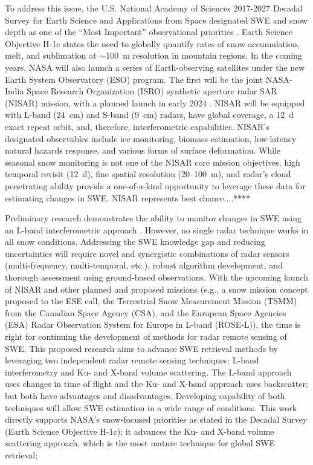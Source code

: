 To address this issue, the U.S. National Academy of Sciences 2017-2027 Decadal Survey for Earth Science and Applications from Space designated SWE and snow depth as one of the “Most Important” observational priorities \citep{nationalacademiesofsciencesengineeringandmedicineThrivingOurChanging2019}. Earth Science Objective H-1c states the need to globally quantify rates of snow accumulation, melt, and sublimation at $\sim$100~m resolution in mountain regions. In the coming years, NASA will also launch a series of Earth-observing satellites under the new Earth System Observatory (ESO) program. The first will be the joint NASA-India Space Research Organization (ISRO) synthetic aperture radar SAR (NISAR) mission, with a planned launch in early 2024 \citep{rosenNASAISROSARNISAR2017, kelloggNASAISROSyntheticAperture2020}. NISAR will be equipped with L-band (24~cm) and S-band (9~cm) radars, have global coverage, a 12~d exact repeat orbit, and, therefore, interferometric capabilities. NISAR’s designated observables include ice monitoring, biomass estimation, low-latency natural hazards response, and various forms of surface deformation. While seasonal snow monitoring is not one of the NISAR core mission objectives, high temporal revisit (12~d), fine spatial resolution (20--100~m), and radar’s cloud penetrating ability provide a one-of-a-kind opportunity to leverage these data for estimating changes in SWE. NISAR represents best chance....****


Preliminary research demonstrates the ability to monitor changes in SWE using an L-band interferometric approach \citep{guneriussenInSAREstimationChanges2001,rottSnowMassRetrieval2003,deebMonitoringSnowpackEvolution2011}. However, no single radar technique works in all snow conditions. Addressing the SWE knowledge gap and reducing uncertainties will require novel and synergistic combinations of radar sensors (multi-frequency, multi-temporal, etc.), robust algorithm development, and thorough assessment using ground-based observations.
With the upcoming launch of NISAR and other planned and proposed missions (e.g., a snow mission concept proposed to the ESE call, the Terrestrial Snow Measurement Mission (TSMM) from the Canadian Space Agency (CSA), and the European Space Agencies (ESA) Radar Observation System for Europe in L-band (ROSE-L)), the time is right for continuing the development of methods for radar remote sensing of SWE. This proposed research aims to advance SWE retrieval methods by leveraging two independent radar remote sensing techniques: L-band interferometry and Ku- and X-band volume scattering. The L-band approach uses changes in time of flight and the Ku- and X-band approach uses backscatter; but both have advantages and disadvantages. Developing capability of both techniques will allow SWE estimation in a wide range of conditions. This work directly supports NASA’s snow-focused priorities as stated in the Decadal Survey (Earth Science Objective H-1c); it advances the Ku- and X-band volume scattering approach, which is the most mature technique for global SWE retrieval;






